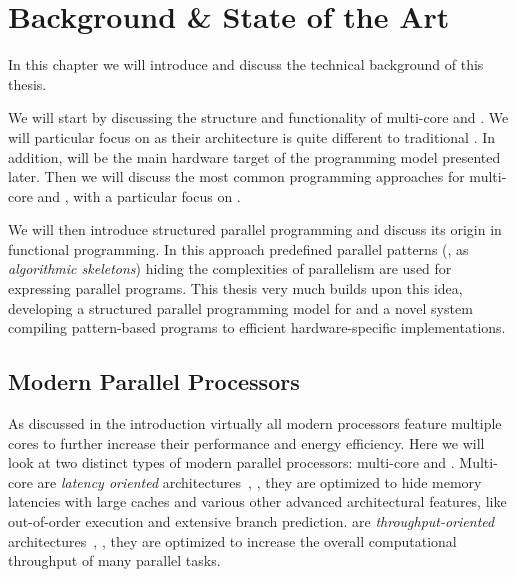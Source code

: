 
\chapter{Background \& State of the Art} %

\label{chapter:background}
\label{chapter:state-of-the-art}

In this chapter we will introduce and discuss the technical background of this thesis.

We will start by discussing the structure and functionality of multi-core \CPUs and \GPUs.
We will particular focus on \GPUs as their architecture is quite different to traditional \CPUs.
In addition, \GPUs will be the main hardware target of the \SkelCL programming model presented later.
Then we will discuss the most common programming approaches for multi-core \CPUs and \GPUs, with a particular focus on \OpenCL.

We will then introduce structured parallel programming and discuss its origin in functional programming.
In this approach predefined parallel patterns (\aka, as \emph{algorithmic skeletons}) hiding the complexities of parallelism are used for expressing parallel programs.
This thesis very much builds upon this idea, developing a structured parallel programming model for \GPUs and a novel system compiling pattern-based programs to efficient hardware-specific implementations.

\section{Modern Parallel Processors}
As discussed in the introduction virtually all modern processors feature multiple cores to further increase their performance and energy efficiency.
Here we will look at two distinct types of modern parallel processors: multi-core \CPUs and \GPUs.
Multi-core \CPUs are \emph{latency oriented} architectures~\cite{GarlandK10}, \ie, they are optimized to hide memory latencies with large caches and various other advanced architectural features, like out-of-order execution and extensive branch prediction.
\GPUs are \emph{throughput-oriented} architectures~\cite{GarlandK10}, \ie, they are optimized to increase the overall computational throughput of many parallel tasks.


